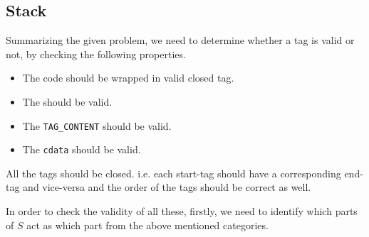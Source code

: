 \subsection{Stack}

Summarizing the given problem, we need to determine whether a tag is valid or not, by checking the following properties.

\begin{itemize}
\item The code should be wrapped in valid closed tag.

\item The  should be valid.

\item The \texttt{TAG\_CONTENT} should be valid.

\item The \texttt{cdata} should be valid.
\end{itemize}

All the tags should be closed. i.e. each start-tag should have a corresponding end-tag and vice-versa and the order of the tags should be correct as well.

In order to check the validity of all these, firstly, we need to identify which parts of $S$ act as which part from the above mentioned categories.

